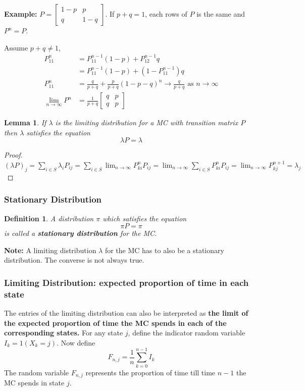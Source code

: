 \documentclass[11pt,a4paper]{article}
\newtheorem{definition}{Definition}
\newtheorem{lemma}{Lemma}
\begin{document}
\textbf{Example: }$P=\begin{bmatrix}
    1-p&p\\
    q&1-q
\end{bmatrix}$. If $p+q=1$, each rows of $P$ is the same and $P^n=P$.

Assume $p+q\neq 1$,
\begin{equation}
    \begin{aligned}
        P^n_{11}&=P^{n-1}_{11}(1-p)+P^{n-1}_{12}q\\&=P^{n-1}_{11}(1-p)+(1-P^{n-1}_{11})q\\
        P^n_{11}&=\frac{q}{p+q}+\frac{p}{p+q}(1-p-q)^n \rightarrow \frac{q}{p+q}\text{ as }n \rightarrow \infty\\
        \lim_{n \rightarrow \infty}P^n&=\frac{1}{p+q}\begin{bmatrix}
            q&p\\
            q&p
        \end{bmatrix}
    \end{aligned}
    \nonumber
\end{equation}

\begin{lemma}
    If $\lambda$ is the limiting distribution for a MC with transition matrix $P$ then $\lambda$ satisfies the equation $$\lambda P=\lambda$$
\end{lemma}
\begin{proof}
    $(\lambda P)_j=\sum_{i\in S}\lambda_i P_{ij}=\sum_{i\in S}\lim_{n \rightarrow \infty}P_{ki}^nP_{ij}=\lim_{n \rightarrow \infty}\sum_{i\in S}P_{ki}^nP_{ij}=\lim_{n \rightarrow \infty}P_{kj}^{n+1}=\lambda_j$
\end{proof}

\subsubsection{Stationary Distribution}
\begin{definition}
    A distribution $\pi$ which satisfies the equation $$\pi P=\pi$$ is called a \textbf{stationary distribution} for the MC.
\end{definition}
\textbf{Note: }A limiting distribution $\lambda$ for the MC has to also be a stationary distribution. The converse is not always true.



\subsubsection{Limiting Distribution: expected proportion of time in each state}
The entries of the limiting distribution can also be interpreted as \textbf{the limit of the expected proportion of time the MC spends in each of the corresponding states.} For any state $j$, define the indicator random variable $I_k=1(X_k=j)$. Now define $$F_{n,j}=\frac{1}{n}\sum_{k=0}^{n-1}I_k$$
The random variable $F_{n,j}$ represents the proportion of time till time $n-1$ the MC spends in state $j$.
\end{document}
